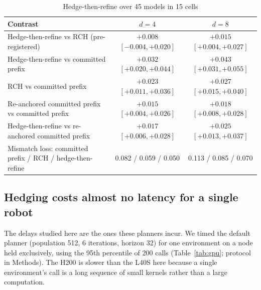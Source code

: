 \documentclass[aps,physrev,\manuscriptlayout,superscriptaddress,
  longbibliography,amsmath,amssymb]{revtex4-2}
\begin{document}
\begin{table}[t]
\centering
\caption{Hedge-then-refine over 45 models in 15 cells}\label{tab:htr}
\begin{tabular*}{\textwidth}{@{\extracolsep\fill}lcc@{}}
\toprule
Contrast & $d=4$ & $d=8$ \\
\midrule
Hedge-then-refine vs RCH (pre-registered) & $+0.008$ $[-0.004, +0.020]$ & $+0.015$ $[+0.004, +0.027]$ \\
Hedge-then-refine vs committed prefix & $+0.032$ $[+0.020, +0.044]$ & $+0.043$ $[+0.031, +0.055]$ \\
RCH vs committed prefix & $+0.023$ $[+0.011, +0.036]$ & $+0.027$ $[+0.015, +0.040]$ \\
Re-anchored committed prefix vs committed prefix & $+0.015$ $[+0.004, +0.026]$ & $+0.018$ $[+0.008, +0.028]$ \\
Hedge-then-refine vs re-anchored committed prefix & $+0.017$ $[+0.006, +0.028]$ & $+0.025$ $[+0.013, +0.037]$ \\
\midrule
Mismatch loss: committed prefix / RCH / hedge-then-refine & 0.082 / 0.059 / 0.050 & 0.113 / 0.085 / 0.070 \\
\bottomrule
\end{tabular*}

\par{}
\end{table}

\subsection{Hedging costs almost no latency for a single robot}\label{sec:latency}

The delays studied here are the ones these planners incur. We timed the default planner (population 512, 6 iterations, horizon 32) for one environment on a node held exclusively, using the 95th percentile of 200 calls (Table~\ref{tab:gpu}; protocol in Methods). The H200 is slower than the L40S here because a single environment's call is a long sequence of small kernels rather than a large computation.
\end{document}
